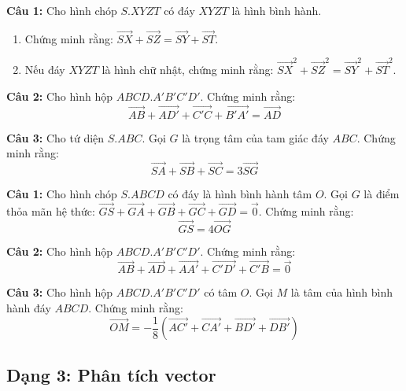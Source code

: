 \documentclass[12pt]{article}
\begin{document}
	\begin{btvang}[]
		\textbf{Câu 1:} Cho hình chóp $S.XYZT$ có đáy $XYZT$ là hình bình hành.
		\begin{enumerate}[label=\alph*)]
			\item Chứng minh rằng: $\overrightarrow{SX} + \overrightarrow{SZ} = \overrightarrow{SY} + \overrightarrow{ST}$.
			\item Nếu đáy $XYZT$ là hình chữ nhật, chứng minh rằng: $\overrightarrow{SX}^2 + \overrightarrow{SZ}^2 = \overrightarrow{SY}^2 + \overrightarrow{ST}^2$.
		\end{enumerate}
		
		\vspace{0.2cm}
		\textbf{Câu 2:} Cho hình hộp $ABCD.A'B'C'D'$. Chứng minh rằng:
		$$ \overrightarrow{AB} + \overrightarrow{AD'} + \overrightarrow{C'C} + \overrightarrow{B'A'} = \overrightarrow{AD} $$
		
		\vspace{0.2cm}
		\textbf{Câu 3:} Cho tứ diện $S.ABC$. Gọi $G$ là trọng tâm của tam giác đáy $ABC$. Chứng minh rằng:
		$$ \overrightarrow{SA} + \overrightarrow{SB} + \overrightarrow{SC} = 3\overrightarrow{SG} $$
	\end{btvang}
	
	\begin{btdo}[]
		\textbf{Câu 1:} Cho hình chóp $S.ABCD$ có đáy là hình bình hành tâm $O$. Gọi $G$ là điểm thỏa mãn hệ thức: $\overrightarrow{GS} + \overrightarrow{GA} + \overrightarrow{GB} + \overrightarrow{GC} + \overrightarrow{GD} = \vec{0}$. Chứng minh rằng:
		$$ \overrightarrow{GS} = 4\overrightarrow{OG} $$
		
		\vspace{0.2cm}
		\textbf{Câu 2:} Cho hình hộp $ABCD.A'B'C'D'$. Chứng minh rằng:
		$$ \overrightarrow{AB} + \overrightarrow{AD} + \overrightarrow{AA'} + \overrightarrow{C'D'} + \overrightarrow{C'B} = \vec{0} $$
		
		\vspace{0.2cm}
		\textbf{Câu 3:} Cho hình hộp $ABCD.A'B'C'D'$ có tâm $O$. Gọi $M$ là tâm của hình bình hành đáy $ABCD$. Chứng minh rằng:
		$$ \overrightarrow{OM} = -\frac{1}{8}(\overrightarrow{AC'} + \overrightarrow{CA'} + \overrightarrow{BD'} + \overrightarrow{DB'}) $$
	\end{btdo}
	
	\subsection{Dạng 3: Phân tích vector}
	
\end{document}
